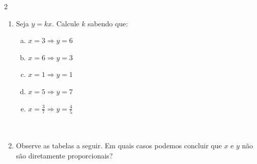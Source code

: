 \documentclass[a4paper,14pt]{article}
\begin{document}
\begin{multicols}{2}
\begin{enumerate}
	        \begin{enumerate}[a)]
		       	\item $y = 8x$
		       	\item $y = \frac{2}{3}x$
		       	\item $4y = 9x$
		       	\item $3y = x$
		       	\item $\sqrt{3}y = \sqrt{27}x$
		       	\item $\frac{1}{y} = x$
		       	\item $\sqrt{y} = x$
		       	\item $y = \sqrt{x}$
		       	\item $y^2 = x$
		       	\item $y = 2x^2$
		       	\item $y = 4x^3$
		       	\item $4y = 16x^2$
		       	\item $y = x^\frac{3}{5}$
		       	\item $y^2 = x^3$
		       	\item $y = \frac{1}{x + 6}$
		       	\item $y = \frac{x - 3}{x + 3}$
	       \end{enumerate}
           \item Seja $y = kx$. Calcule $k$ sabendo que:
           \begin{enumerate}[a)]
           		\item $x = 3 \Rightarrow y = 6$
           		\item $x = 6 \Rightarrow y = 3$
           		\item $x = 1 \Rightarrow y = 1$
           		\item $x = 5 \Rightarrow y = 7$
           		\item $x = \frac{3}{7} \Rightarrow y = \frac{4}{5}$\\\\\\
           \end{enumerate}
           \item Observe as tabelas a seguir. Em quais casos podemos concluir que $x$ e $y$ não são diretamente proporcionais?

\end{enumerate}
\end{multicols}
\end{document}
